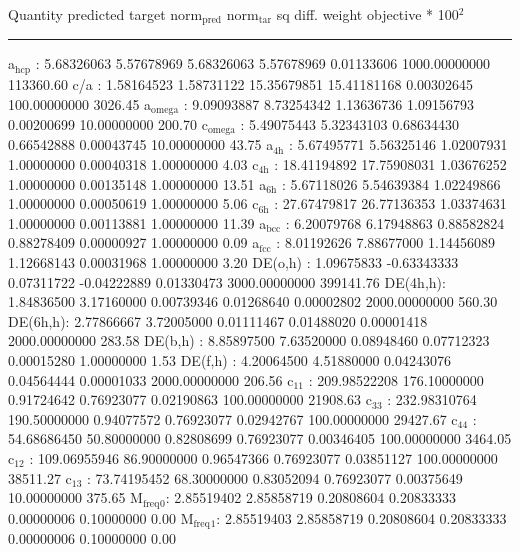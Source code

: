 \documentclass[11pt]{article}
\begin{document}
Quantity      predicted    target     norm\(_{\text{pred}}\)   norm\(_{\text{tar}}\)    sq diff.      weight    objective * 100\(^{\text{2}}\) 

\noindent\rule{\textwidth}{0.5pt}
a\(_{\text{hcp}}\)   :   5.68326063   5.57678969   5.68326063   5.57678969   0.01133606 1000.00000000    113360.60
c/a     :   1.58164523   1.58731122  15.35679851  15.41181168   0.00302645 100.00000000      3026.45
a\(_{\text{omega}}\) :   9.09093887   8.73254342   1.13636736   1.09156793   0.00200699  10.00000000       200.70
c\(_{\text{omega}}\) :   5.49075443   5.32343103   0.68634430   0.66542888   0.00043745  10.00000000        43.75
a\(_{\text{4h}}\)    :   5.67495771   5.56325146   1.02007931   1.00000000   0.00040318   1.00000000         4.03
c\(_{\text{4h}}\)    :  18.41194892  17.75908031   1.03676252   1.00000000   0.00135148   1.00000000        13.51
a\(_{\text{6h}}\)    :   5.67118026   5.54639384   1.02249866   1.00000000   0.00050619   1.00000000         5.06
c\(_{\text{6h}}\)    :  27.67479817  26.77136353   1.03374631   1.00000000   0.00113881   1.00000000        11.39
a\(_{\text{bcc}}\)   :   6.20079768   6.17948863   0.88582824   0.88278409   0.00000927   1.00000000         0.09
a\(_{\text{fcc}}\)   :   8.01192626   7.88677000   1.14456089   1.12668143   0.00031968   1.00000000         3.20
DE(o,h) :   1.09675833  -0.63343333   0.07311722  -0.04222889   0.01330473 3000.00000000    399141.76
DE(4h,h):   1.84836500   3.17160000   0.00739346   0.01268640   0.00002802 2000.00000000       560.30
DE(6h,h):   2.77866667   3.72005000   0.01111467   0.01488020   0.00001418 2000.00000000       283.58
DE(b,h) :   8.85897500   7.63520000   0.08948460   0.07712323   0.00015280   1.00000000         1.53
DE(f,h) :   4.20064500   4.51880000   0.04243076   0.04564444   0.00001033 2000.00000000       206.56
c\(_{\text{11}}\)    : 209.98522208 176.10000000   0.91724642   0.76923077   0.02190863 100.00000000     21908.63
c\(_{\text{33}}\)    : 232.98310764 190.50000000   0.94077572   0.76923077   0.02942767 100.00000000     29427.67
c\(_{\text{44}}\)    :  54.68686450  50.80000000   0.82808699   0.76923077   0.00346405 100.00000000      3464.05
c\(_{\text{12}}\)    : 109.06955946  86.90000000   0.96547366   0.76923077   0.03851127 100.00000000     38511.27
c\(_{\text{13}}\)    :  73.74195452  68.30000000   0.83052094   0.76923077   0.00375649  10.00000000       375.65
M\(_{\text{freq}}\)\(_{\text{0}}\):   2.85519402   2.85858719   0.20808604   0.20833333   0.00000006   0.10000000         0.00
M\(_{\text{freq}}\)\(_{\text{1}}\):   2.85519403   2.85858719   0.20808604   0.20833333   0.00000006   0.10000000         0.00
\end{document}

